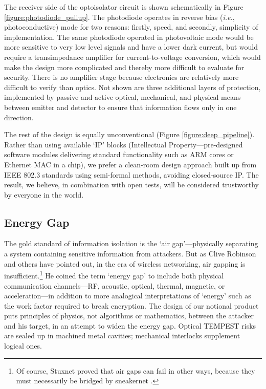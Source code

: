 \documentclass[conference]{IEEEtran}
\begin{document}
The receiver side of the optoisolator circuit is shown schematically in
Figure \ref{figure:photodiode_pullup}. The photodiode operates in reverse
bias ({\it i.e.}, photoconductive) mode for two reasons: firstly, speed, and
secondly, simplicity of implementation. The same photodiode operated in
photovoltaic mode would be more sensitive to very low level signals and have
a lower dark current, but would require a transimpedance amplifier for
current-to-voltage conversion, which would make the design more complicated
and thereby more difficult to evaluate for security. There is no amplifier
stage because electronics are relatively more difficult to verify than
optics. Not shown are three additional layers of protection, implemented by
passive and active optical, mechanical, and physical means between emitter
and detector to ensure that information flows only in one direction.

The rest of the design is equally unconventional (Figure
\ref{figure:deep_pipeline}). Rather than using available `IP' blocks
(Intellectual Property---pre-designed software modules delivering standard
functionality such as ARM cores or Ethernet MAC in a chip), we prefer a
clean-room
design approach built up from IEEE 802.3 standards using semi-formal methods,
avoiding closed-source IP. The result, we believe, in combination with open
tests, will be considered trustworthy by everyone in the world.

\subsection{Energy Gap}

The gold standard of information isolation is the `air gap'---physically
separating a system containing sensitive information from attackers. But as
Clive Robinson and others have pointed out, in the era of wireless
networking, air gapping is insufficient.\footnote{Of course, Stuxnet proved
that air gaps can fail in other ways, because they must necessarily be
bridged by sneakernet \cite{Kushner2013a,Langner2013a}.} He coined the term
`energy gap' to include both physical communication channels---RF, acoustic,
optical, thermal, magnetic, or acceleration---in addition to more analogical
interpretations of `energy' such as the work factor required to break
encryption. The design of our notional product puts principles of physics,
not algorithms or mathematics, between the attacker and his target, in an
attempt to widen the energy gap. Optical TEMPEST risks are sealed up in
machined metal cavities; mechanical interlocks supplement logical ones.
\end{document}
